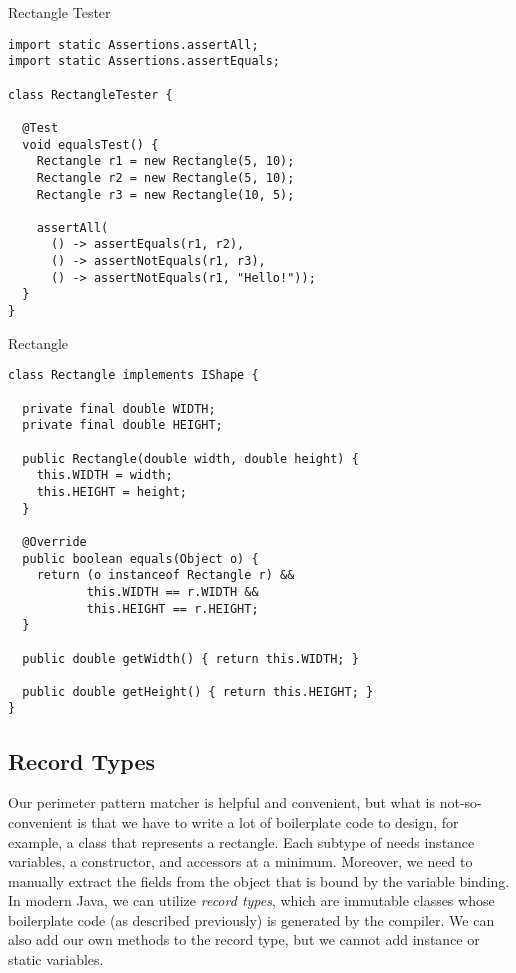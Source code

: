 \begin{verbnobox}[\footnotesize]
\begin{verbnobox}[\footnotesize]
\begin{cl}[]{Rectangle Tester}
\begin{lstlisting}[language=MyJava]
import static Assertions.assertAll;
import static Assertions.assertEquals;

class RectangleTester {

  @Test
  void equalsTest() {
    Rectangle r1 = new Rectangle(5, 10);
    Rectangle r2 = new Rectangle(5, 10);
    Rectangle r3 = new Rectangle(10, 5);

    assertAll(
      () -> assertEquals(r1, r2),
      () -> assertNotEquals(r1, r3),
      () -> assertNotEquals(r1, "Hello!"));
  }
}
\end{lstlisting}
\end{cl}

\begin{cl}[]{Rectangle}
\begin{lstlisting}[language=MyJava]
class Rectangle implements IShape {

  private final double WIDTH;
  private final double HEIGHT;

  public Rectangle(double width, double height) {
    this.WIDTH = width;
    this.HEIGHT = height;
  }

  @Override
  public boolean equals(Object o) {
    return (o instanceof Rectangle r) &&
           this.WIDTH == r.WIDTH &&
           this.HEIGHT == r.HEIGHT;
  }

  public double getWidth() { return this.WIDTH; }

  public double getHeight() { return this.HEIGHT; }
}
\end{lstlisting}
\end{cl}


\subsection*{Record Types}

Our perimeter pattern matcher is helpful and convenient, but what is not-so-convenient is that we have to write a lot of boilerplate code to design, for example, a class that represents a rectangle. Each subtype of  needs instance variables, a constructor, and accessors at a minimum. Moreover, we need to manually extract the fields from the object that is bound by the variable binding. In modern Java, we can utilize \textit{record types}, which are immutable classes whose boilerplate code (as described previously) is generated by the compiler. We can also add our own methods to the record type, but we cannot add instance or static variables.


\end{verbnobox}
\end{verbnobox}
